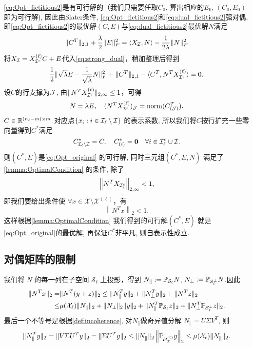 \eqref{eq:Opt_fictitious2}是有可行解的（我们只需要任取\(C_0\).
算出相应的\(E_0\), \((C_0, E_0)\)即为可行解), 因此由Slater条件\cite{boyd2004convex},
\eqref{eq:Opt_fictitious2}和\eqref{eq:dual_fictitious2}强对偶,
即\eqref{eq:Opt_fictitious2}的最优解\((C, E)\)与\eqref{eq:dual_fictitious2}最优解\(N\)满足
\begin{align}\label{eq:strong_dual}
  \|C^T\|_{2,1}+\frac{\lambda}{2}\|E\|_F^2 = \langle X_{\mathcal{I}},N \rangle -
  \frac{1}{2\lambda} \|N\|_F^2   
\end{align}
将\(X_{\mathcal{I}}=X^{(\ell)}_{\mathcal{I}^c}C+E\)代入\eqref{eq:strong_dual}，稍加整理后得到
\[ \frac{1}{2}\| \sqrt{\lambda}E-\frac{1}{\sqrt{\lambda}}N \|_F^2+
\|C^T\|_{2,1}-\langle C^T, N^T X^{(\ell)}_{\mathcal{I}^c}\rangle = 0. \]
设\(C\)的行支撑为\(\mathcal{J}\), 由\(\|N^T X^{(\ell)}_{\mathcal{I}^c}\|_{2, \infty} \leq 1\)，可得
\begin{align*}
  N=\lambda E, \quad (N^T X^{(\ell)}_{\mathcal{I}^c})_{\mathcal{J}} =\operatorname{norm}(C_{(\mathcal{J})}^T).
\end{align*}
\(C\in \mathbb{R}^{(n_\ell-m)\times m}\) 对应点\(\{ x_i: i \in \mathcal{I}_\ell \setminus \mathcal{I}\}\)
的表示系数, 所以我们将\(C\)按行扩充一些零向量得到\(C^*\)满足
\[ C^*_{\mathcal{I}_\ell \setminus \mathcal{I}} = C, \quad C^*_{(i)} = \mathbf{0}
\quad \forall i \in \mathcal{I}^c_\ell \cup \mathcal{I}. \]
则\((C^*, E)\)是\eqref{eq:Opt_original} 的可行解, 同时三元组\((C^*, E, N)\)
满足了\autoref{lemma:OptimalCondition} 的条件, 除了
\begin{equation*}
  \left\|N^T X_{\mathcal{I}_\ell^c}\right\|_{2,\infty}<1,
\end{equation*}
即我们要给出条件使 \(\forall x \in \mathcal{X}\setminus \mathcal{X}^{(\ell)}\)，有
\begin{equation}\label{eq:dual_separation_condition}
   \left \| N^T x\right \|_2 < 1.
\end{equation}
这样根据\autoref{lemma:OptimalCondition} 我们得到的可行解\((C^*, E)\)
就是\eqref{eq:Opt_original}的最优解, 再保证\(C^*\)非平凡, 则自表示性成立.

\subsection{对偶矩阵的限制}\label{sec:dual_separation}
我们将 \(N\) 的每一列在子空间 \(\mathcal{S}_{\ell}\) 上投影，得到 \(N_{\parallel}
:=\mathbb{P}_{\mathcal{S}_\ell}N\), \(N_{\perp} := \mathbb{P}_{\mathcal{S}_{\ell}^\perp}N\).因此
\begin{align}\label{eq:showing_dual_sep_cond}
  \| N^T x \|_2 =& \| N^T (y+z)\|_2 \leq \| N_{\parallel}^T y\|_2+\|
  N_{\perp}^T y\|_2+\|N^T z\|_2 \nonumber\\
  \leq& \mu(\mathcal{X}_{\ell}) \|N_{\parallel}\|_2 + \|N_{\perp}\|_2\|y\|_2
  + \|N_{\parallel}^T \mathbb{P}_{\mathcal{S}_{\ell}} z\|_2 
  + \|N_\perp^T \mathbb{P}_{\mathcal{S}_\ell^\perp} z\|_2 .
\end{align}
最后一个不等号是根据\autoref{def:incoherence}, 对\(N_\parallel\)做奇异值分解
\(N_\parallel = U\Sigma V^T\), 则
\[
  \|N_\parallel^T y\|_2 = \|V \Sigma U^T y\|_2 = \|\Sigma U^T y\|_2 \le
  \|N_\parallel\|_2 \left\|\mathbb{P}_{\mathcal{U}_{\mathcal{I}}^{(\ell)}} y\right\|_2 \le \mu(\mathcal{X}_\ell)
  \|N_\parallel\|_2.
\]


